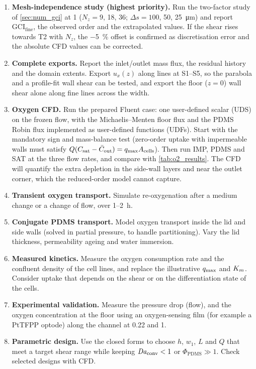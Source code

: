 \begin{enumerate}
\item \textbf{Mesh-independence study (highest priority).} Run the two-factor study of \cref{sec:num_gci} at \SI{1}{\uLmin} ($N_z=9$, 18, 36; $\Delta s=100$, 50, \SI{25}{\micro\metre}) and report $\mathrm{GCI}_{\mathrm{fine}}$, the observed order and the extrapolated values. If the shear rises towards T2 with $N_z$, the \SI{-5}{\percent} offset is confirmed as discretisation error and the absolute CFD values can be corrected.
\item \textbf{Complete exports.} Report the inlet/outlet mass flux, the residual history and the domain extents. Export $u_x(z)$ along lines at S1--S5, so the parabola and a profile-fit wall shear can be tested, and export the floor ($z=0$) wall shear alone along fine lines across the width.
\item \textbf{Oxygen CFD.} Run the prepared Fluent case: one user-defined scalar (UDS) on the frozen flow, with the Michaelis--Menten floor flux and the PDMS Robin flux implemented as user-defined functions (UDFs). Start with the mandatory sign and mass-balance test (zero-order uptake with impermeable walls must satisfy $Q(C_{\mathrm{sat}}-\bar C_{\mathrm{out}})=q_{\max} A_{\mathrm{cells}}$). Then run IMP, PDMS and SAT at the three flow rates, and compare with \cref{tab:o2_results}. The CFD will quantify the extra depletion in the side-wall layers and near the outlet corner, which the reduced-order model cannot capture.
\item \textbf{Transient oxygen transport.} Simulate re-oxygenation after a medium change or a change of flow, over 1--\SI{2}{h}.
\item \textbf{Conjugate PDMS transport.} Model oxygen transport inside the lid and side walls (solved in partial pressure, to handle partitioning). Vary the lid thickness, permeability ageing and water immersion.
\item \textbf{Measured kinetics.} Measure the oxygen consumption rate and the confluent density of the cell lines, and replace the illustrative $q_{\max}$ and $K_{m}$. Consider uptake that depends on the shear or on the differentiation state of the cells.
\item \textbf{Experimental validation.} Measure the pressure drop (flow), and the oxygen concentration at the floor using an oxygen-sensing film (for example a PtTFPP optode) along the channel at 0.22 and \SI{1}{\uLmin}.
\item \textbf{Parametric design.} Use the closed forms to choose $h$, $w_1$, $L$ and $Q$ that meet a target shear range while keeping $\mathit{Da}_{\mathrm{conv}}<1$ or $\Phi_{\mathrm{PDMS}}\gg1$. Check selected designs with CFD.
\end{enumerate}
